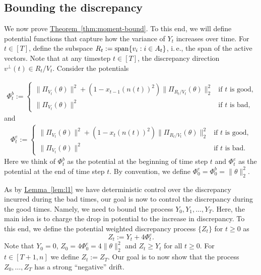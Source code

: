 \documentclass[11pt]{article}
\numberwithin{equation}{section}
\theoremstyle{definition}
\theoremstyle{plain}
\newcommand{\ie}{i.\,e.}
\newcommand{\expref}[2]{\hyperref[#2]{#1~\ref{#2}}}
\begin{document}
\subsection{Bounding the discrepancy}
We now prove \expref{Theorem}{thm:moment-bound}. To this end, we will define potential functions that capture how the variance of $Y_t$ increases over time.
 For $t \in [T]$, define the subspace $R_t := {\rm span}\{v_i: i \in A_t\}$,
\ie, the span of the active vectors. Note that at any timestep $t \in [T]$, the
discrepancy direction $v^\perp(t) \in R_t / V_t$. Consider the potentials

\begin{align*}
\Phi_t^b :=
	\begin{cases}
		 \|\Pi_{V_t}(\theta)\|^2 + (1-x_{t-1}(n(t))^2) \|\Pi_{R_t/V_t}(\theta)\|_2^2  & \mbox{if }t \text{ is good,}  \\
		\|\Pi_{V_t}(\theta) \|^2  &\mbox{if } t \text{ is bad,}
	\end{cases}
\end{align*}
and
\begin{align*}
\Phi_t^e :=
	\begin{cases}
		 \|\Pi_{V_t}(\theta)\|^2 + (1-x_t(n(t))^2) \|\Pi_{R_t/V_t}(\theta)\|_2^2  & \mbox{if }t \text{ is good,}  \\
		 \|\Pi_{V_t}(\theta) \|^2  &\mbox{if } t \text{ is bad.}
	\end{cases}
\end{align*}
Here we think of $\Phi_t^b$ as the potential at the beginning of time step $t$ and
$\Phi_t^e$ as the potential at the end of time step $t$. By convention, we define
$\Phi_0^e = \Phi_0^b = \|\theta\|_2^2$.

As by \expref{Lemma}{lem:l1} we have deterministic control over the discrepancy
incurred during the bad times, our goal is now to control the discrepancy
during the good times. Namely, we need to bound the process
$Y_0,Y_1,\dots,Y_T$. Here, the main idea is to charge the drop in potential to the increase in discrepancy. To this end, we define the potential weighted
discrepancy process $\{Z_t\}$ for $t\ge 0$ as
\[
Z_t := Y_t + 4 \Phi^e_t.
\]
Note that $Y_0=0$, $Z_0 = 4\Phi^e_0 = 4\|\theta\|_2^2$ and $Z_t \geq Y_t$ for all $t \geq 0$.
For $t\in[T+1,n]$ we define $Z_t:=Z_{T}$. Our goal is to now show that the process $Z_0,\dots,Z_T$ has
a strong ``negative'' drift.
\end{document}
